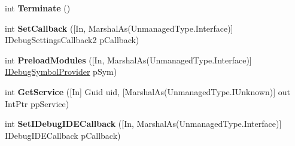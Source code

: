 \begin{DoxyCompactItemize}
\item 
\hypertarget{interface_microsoft_1_1_visual_studio_1_1_debugger_1_1_interop_e_e_1_1_i_debug_expression_evaluator3_ad2fbe3c014b080a11c187f76c8443f03}{int {\bfseries Terminate} ()}\label{interface_microsoft_1_1_visual_studio_1_1_debugger_1_1_interop_e_e_1_1_i_debug_expression_evaluator3_ad2fbe3c014b080a11c187f76c8443f03}

\item 
\hypertarget{interface_microsoft_1_1_visual_studio_1_1_debugger_1_1_interop_e_e_1_1_i_debug_expression_evaluator3_a2b9da2678936875d55d6acd48eecbe1d}{int {\bfseries Set\+Callback} (\mbox{[}In, Marshal\+As(Unmanaged\+Type.\+Interface)\mbox{]} I\+Debug\+Settings\+Callback2 p\+Callback)}\label{interface_microsoft_1_1_visual_studio_1_1_debugger_1_1_interop_e_e_1_1_i_debug_expression_evaluator3_a2b9da2678936875d55d6acd48eecbe1d}

\item 
\hypertarget{interface_microsoft_1_1_visual_studio_1_1_debugger_1_1_interop_e_e_1_1_i_debug_expression_evaluator3_a06f2567997f6366e8f6ba2045cd223e0}{int {\bfseries Preload\+Modules} (\mbox{[}In, Marshal\+As(Unmanaged\+Type.\+Interface)\mbox{]} \hyperlink{interface_microsoft_1_1_visual_studio_1_1_debugger_1_1_interop_e_e_1_1_i_debug_symbol_provider}{I\+Debug\+Symbol\+Provider} p\+Sym)}\label{interface_microsoft_1_1_visual_studio_1_1_debugger_1_1_interop_e_e_1_1_i_debug_expression_evaluator3_a06f2567997f6366e8f6ba2045cd223e0}

\item 
\hypertarget{interface_microsoft_1_1_visual_studio_1_1_debugger_1_1_interop_e_e_1_1_i_debug_expression_evaluator3_a9c439a6b6692cb0f420f0c41174ce640}{int {\bfseries Get\+Service} (\mbox{[}In\mbox{]} Guid uid, \mbox{[}Marshal\+As(Unmanaged\+Type.\+I\+Unknown)\mbox{]} out Int\+Ptr pp\+Service)}\label{interface_microsoft_1_1_visual_studio_1_1_debugger_1_1_interop_e_e_1_1_i_debug_expression_evaluator3_a9c439a6b6692cb0f420f0c41174ce640}

\item 
\hypertarget{interface_microsoft_1_1_visual_studio_1_1_debugger_1_1_interop_e_e_1_1_i_debug_expression_evaluator3_ae099347cf82dc9db1d607c61e38d6619}{int {\bfseries Set\+I\+Debug\+I\+D\+E\+Callback} (\mbox{[}In, Marshal\+As(Unmanaged\+Type.\+Interface)\mbox{]} I\+Debug\+I\+D\+E\+Callback p\+Callback)}\label{interface_microsoft_1_1_visual_studio_1_1_debugger_1_1_interop_e_e_1_1_i_debug_expression_evaluator3_ae099347cf82dc9db1d607c61e38d6619}


\end{DoxyCompactItemize}
